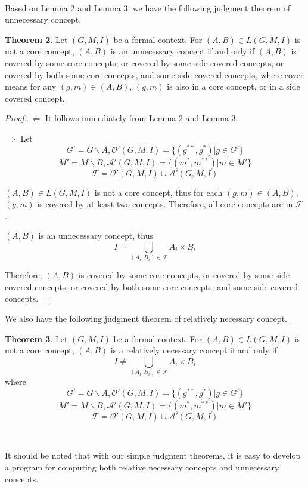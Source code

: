 \documentclass[11pt]{article}
\numberwithin{equation}{subsection}
\begin{document}
\

Based on Lemma 2 and Lemma 3, we have the following  judgment theorem of unnecessary concept.


\textbf{ Theorem 2}.   Let $(G, M, I)$ be a formal context. For   $(A,B)\in L(G, M, I)$ is not a core concept,  $(A,B)$ is an unnecessary concept if and only if $(A,B)$ is covered by some core concepts, or covered by some side covered concepts, or covered by both some core concepts, and some side covered concepts, where cover means for any $(g,m)\in (A,B)$, $(g,m)$ is also in a core concept, or in a side covered concept.

\begin{proof}


 $\Leftarrow$ It follows immediately from Lemma 2 and Lemma 3.

$\Rightarrow$
Let
 \[ G' = G\backslash A,  \mathcal{O}'(G,M,I)=\{ (g^{**},g^*)  | g\in G' \} \]
 \[     M' = M\backslash B,  \mathcal{A}'(G,M,I)=\{ (m^{*},m^{**})  | m\in M' \} \]
\[ \mathcal{F} = \mathcal{O}'(G,M,I) \cup  \mathcal{A}'(G,M,I) \]

$(A,B)\in L(G, M, I)$ is not a core concept, thus for each $(g,m)\in (A,B)$, $(g,m)$ is covered by at least two concepts. Therefore, all core concepts are in $\mathcal{F}$.

$(A,B)$ is an unnecessary concept, thus \[ I=\bigcup\limits_{(A_i,B_i)\in \mathcal{F}} A_i\times B_i   \]

Therefore,  $(A,B)$ is covered by some core concepts, or covered by some side covered concepts, or covered by both some core concepts, and some side covered concepts.
\end{proof}

We also have the following  judgment theorem of relatively necessary concept.


\textbf{ Theorem 3}.   Let $(G, M, I)$ be a formal context. For   $(A,B)\in L(G, M, I)$ is not a core concept,  $(A,B)$ is   a relatively necessary concept if and only if \[ I \neq \bigcup\limits_{(A_i,B_i)\in \mathcal{F}} A_i\times B_i   \]
where
\[ G' = G\backslash A,  \mathcal{O}'(G,M,I)=\{ (g^{**},g^*)  | g\in G' \} \]
 \[     M' = M\backslash B,  \mathcal{A}'(G,M,I)=\{ (m^{*},m^{**})  | m\in M' \} \]
\[ \mathcal{F} = \mathcal{O}'(G,M,I) \cup  \mathcal{A}'(G,M,I) \]

\


It should be noted that
with our simple judgment theorems, it is easy to develop a program for computing both  relative necessary concepts and
unnecessary concepts.
\end{document}
